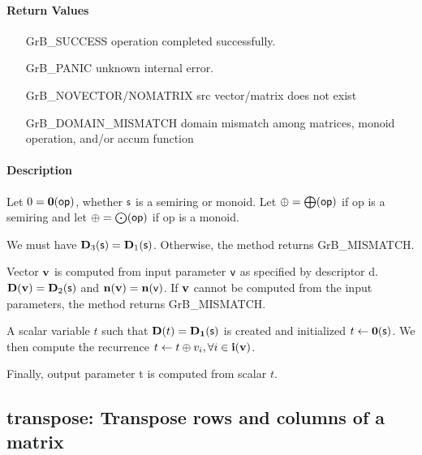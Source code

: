 \paragraph{Return Values}

\begin{itemize}[leftmargin=2.1in]
\item[{\sf GrB\_SUCCESS}]             operation completed successfully.
\item[{\sf GrB\_PANIC}]               unknown internal error.
\item[{\sf GrB\_NOVECTOR/NOMATRIX}]   {\sf src} vector/matrix does not exist
\item[{\sf GrB\_DOMAIN\_MISMATCH}]  
        domain mismatch among matrices, monoid operation, and/or
        accum function 
\end{itemize}

\paragraph{Description}

Let $0 = \bold{0}({\sf op})$, whether ${\sf s}$ is a semiring or monoid.
Let $\oplus = \bigoplus({\sf op})$ if op is a semiring and let 
$\oplus = \bigodot({\sf op})$ if op is a monoid.

We must have $\bold{D}_3({\sf s}) = \bold{D}_1({\sf s})$.
Otherwise, the method returns {\sf GrB\_MISMATCH}.

Vector ${\bf v}$ is computed from input parameter ${\sf v}$ as
specified by descriptor {\sf d}. $\bold{D}({\bf v}) = \bold{D}_2({\sf s})$
and $\bold{n}({\bf v}) = \bold{n}({\sf v})$. If ${\bf v}$ cannot be computed
from the input parameters, the method returns {\sf GrB\_MISMATCH}.

A scalar variable $t$ such that $\bold{D}(t) = \bold{D_1}({\sf s})$ is
created and initialized $t \leftarrow \bold{0}({\sf s})$. 
We then compute the recurrence $t \leftarrow t \oplus v_i, \forall i \in {\bf i}({\bf v})$.

Finally, output parameter {\sf t} is computed from scalar $t$.


\subsection{{\sf transpose}: Transpose rows and columns of a matrix}

